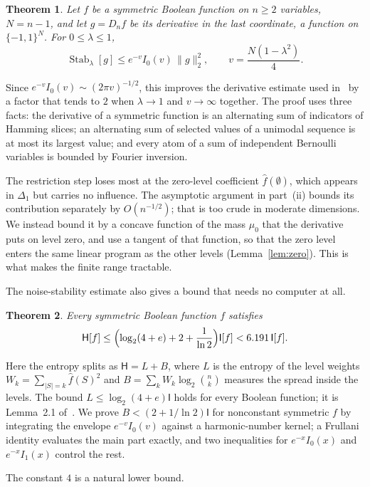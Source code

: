 \documentclass[11pt]{amsart}
\newtheorem{mainthm}{Theorem}
\theoremstyle{definition}
\theoremstyle{remark}
\newcommand{\bits}{\{-1,1\}}
\newcommand{\HH}{\mathsf H}
\newcommand{\I}{\mathsf I}
\newcommand{\wh}[1]{\widehat{#1}}
\DeclareMathOperator{\Stab}{Stab}
\begin{document}
\begin{mainthm}\label{thm:stab}
Let $f$ be a symmetric Boolean function on $n\ge2$ variables, $N=n-1$, and let $g=D_nf$ be its derivative in the last coordinate, a function on $\bits^N$. For $0\le\lambda\le1$,
\[
 \Stab_\lambda[g]\le e^{-v}I_0(v)\,\|g\|_2^2,\qquad v=\frac{N(1-\lambda^2)}{4}.
\]
\end{mainthm}

Since $e^{-v}I_0(v)\sim(2\pi v)^{-1/2}$, this improves the derivative estimate used in~\cite{OWZ11} by a factor that tends to $2$ when $\lambda\to1$ and $v\to\infty$ together. The proof uses three facts: the derivative of a symmetric function is an alternating sum of indicators of Hamming slices; an alternating sum of selected values of a unimodal sequence is at most its largest value; and every atom of a sum of independent Bernoulli variables is bounded by Fourier inversion.

The restriction step loses most at the zero-level coefficient $\wh f(\emptyset)$, which appears in $\Delta_1$ but carries no influence. The asymptotic argument in part~(ii) bounds its contribution separately by $O(n^{-1/2})$; that is too crude in moderate dimensions. We instead bound it by a concave function of the mass $\mu_0$ that the derivative puts on level zero, and use a tangent of that function, so that the zero level enters the same linear program as the other levels (Lemma~\ref{lem:zero}). This is what makes the finite range tractable.

The noise-stability estimate also gives a bound that needs no computer at all.

\begin{mainthm}\label{thm:analytic}
Every symmetric Boolean function $f$ satisfies
\[
 \HH[f]\le\Bigl(\log_2(4+e)+2+\frac1{\ln2}\Bigr)\I[f]<6.191\,\I[f].
\]
\end{mainthm}

Here the entropy splits as $\HH=L+B$, where $L$ is the entropy of the level weights $W_k=\sum_{|S|=k}\wh f(S)^2$ and $B=\sum_kW_k\log_2\binom nk$ measures the spread inside the levels. The bound $L\le\log_2(4+e)\I$ holds for every Boolean function; it is Lemma~2.1 of~\cite{Shm26}. We prove $B<(2+1/\ln2)\I$ for nonconstant symmetric $f$ by integrating the envelope $e^{-v}I_0(v)$ against a harmonic-number kernel; a Frullani identity evaluates the main part exactly, and two inequalities for $e^{-x}I_0(x)$ and $e^{-x}I_1(x)$ control the rest.

The constant $4$ is a natural lower bound.
\end{document}
